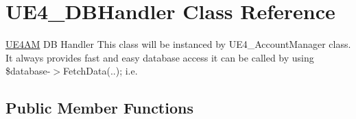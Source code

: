 \hypertarget{class_u_e4___d_b_handler}{\section{U\-E4\-\_\-\-D\-B\-Handler Class Reference}
\label{class_u_e4___d_b_handler}
}


\hyperlink{class_u_e4_a_m}{U\-E4\-A\-M} D\-B Handler This class will be instanced by U\-E4\-\_\-\-Account\-Manager class. It always provides fast and easy database access it can be called by using \$database-\/$>$Fetch\-Data(..); i.\-e.  


\subsection*{Public Member Functions}
